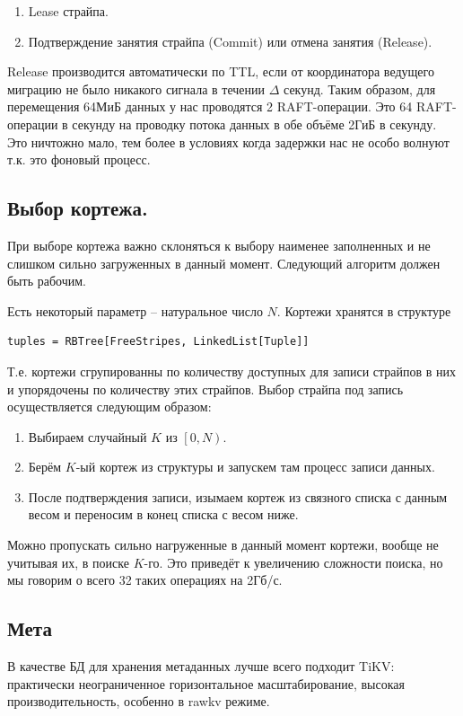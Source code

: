 \documentclass[a4paper,12pt]{article}
\begin{document}
\begin{enumerate}
    \item Lease страйпа.
    \item Подтверждение занятия страйпа (Commit) или отмена занятия (Release).
\end{enumerate}

Release производится автоматически по TTL, если от координатора ведущего миграцию не было никакого сигнала в течении $\Delta$ секунд. Таким образом, для перемещения 64МиБ данных у нас
проводятся 2 RAFT-операции. Это 64 RAFT-операции в секунду на проводку потока данных в обе объёме 2ГиБ в секунду. Это ничтожно мало, тем более в условиях когда задержки нас не особо
волнуют т.к. это фоновый процесс.

\subsection{Выбор кортежа.}

При выборе кортежа важно склоняться к выбору наименее заполненных и не слишком сильно загруженных в данный момент. Следующий алгоритм должен
быть рабочим.

Есть некоторый параметр – натуральное число $N$. Кортежи хранятся в структуре
\begin{lstlisting}
tuples = RBTree[FreeStripes, LinkedList[Tuple]]
\end{lstlisting}
Т.е. кортежи сгрупированны по количеству доступных для записи страйпов в них и упорядочены по количеству этих страйпов. Выбор страйпа под
запись осуществляется следующим образом:
\begin{enumerate}
\item Выбираем случайный $K$ из $\left[ 0, N \right)$.
\item Берём $K$-ый кортеж из структуры и запускем там процесс записи данных.
\item После подтверждения записи, изымаем кортеж из связного списка с данным весом и переносим в конец списка с весом ниже.
\end{enumerate}
Можно пропускать сильно нагруженные в данный момент кортежи, вообще не учитывая их, в поиске $K$-го. Это приведёт
к увеличению сложности поиска, но мы говорим о всего 32 таких операциях на 2Гб/с.

\subsection{Мета}

В качестве БД для хранения метаданных лучше всего подходит TiKV: практически неограниченное горизонтальное масштабирование, высокая
производительность, особенно в rawkv режиме.
\end{document}
